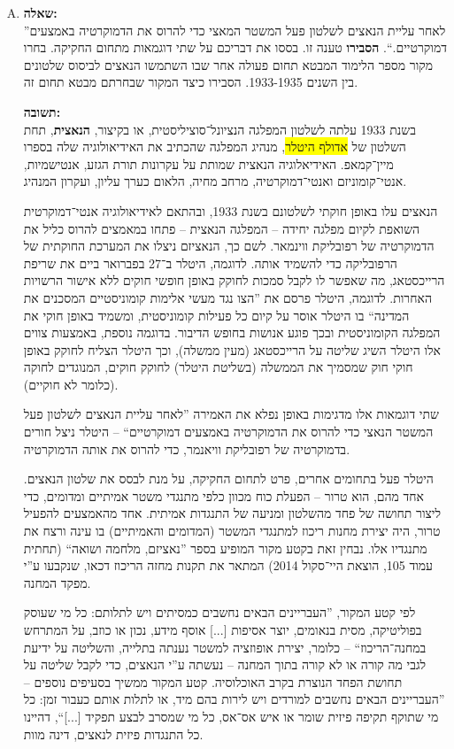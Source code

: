 \documentclass[a4paper]{article}
\newcommand\hl[1]   {\colorbox{yellow}{\!\!#1\!\!}}
\begin{document}
\begin{enumerate}[A.]
			\item \textbf{שאלה: }\\
			''לאחר עליית הנאצים לשלטון פעל המשטר המאצי כדי להרוס את הדמוקרטיה באמצעים דמוקרטיים.``. \textbf{הסבירו} טענה זו. בססו את דבריכם על שתי דוגמאות מתחום החקיקה. בחרו מקור מספר הלימוד המבטא תחום פעולה אחר שבו השתמשו הנאצים לביסוס שלטונים בין השנים 1933-1935. הסבירו כיצד המקור שבחרתם מבטא תחום זה. 
			
			\textbf{תשובה: }\\
			בשנת 1933 עלתה לשלטון המפלגה הנציונל־סוציליסטית, או בקיצור, \textbf{הנאצית}, תחת השלטון של \hl{אדולף היטלר}, מנהיג המפלגה שהכתיב את האידיאולוגיה שלה בספרו מיין־קמאפ. האידיאלוגיה הנאצית שמותת על עקרונות תורת הגזע, אנטישמיות, אנטי־קומוניזם ואנטי־דמוקרטיה, מרחב מחיה, הלאום כערך עליון, ועקרון המנהיג. 
			
			הנאצים עלו באופן חוקתי לשלטונם בשנת 1933, ובהתאם לאידיאולוגיה אנטי־דמוקרטית השואפת לקיום מפלגה יחידה – המפלגה הנאצית – פתחו במאמצים להרוס כליל את הדמוקרטיה של רפובליקת ווינמאר. לשם כך, הנאציזם ניצלו את המערכת החוקתית של הרפובליקה כדי להשמיד אותה. לדוגמה, היטלר ב־27 בפברואר ביים את שריפת הרייכסטאג, מה שאפשר לו לקבל סמכות לחוקק באופן חופשי חוקים ללא אישור הרשויות האחרות. לדוגמה, היטלר פרסם את ''הצו נגד מעשי אלימות קומוניסטיים המסכנים את המדינה`` בו היטלר אוסר על קיום כל פעילות קומוניסטית, ומשמיד באופן חוקי את המפלגה הקומוניסטית ובכך פוגע אנושות בחופש הדיבור. בדוגמה נוספת, באמצעות צווים אלו היטלר השיג שליטה על הרייכסטאג (מעין ממשלה), וכך היטלר הצליח לחוקק באופן חוקי חוק שמסמיך את הממשלה (בשליטת היטלר) לחוקק חוקים, המנוגדים לחוקה (כלומר לא חוקיים). 
			
			שתי דוגמאות אלו מדגימות באופן נפלא את האמירה ''לאחר עליית הנאצים לשלטון פעל המשטר הנאצי כדי להרוס את הדמוקרטיה באמצעים דמוקרטיים`` – היטלר ניצל חורים בדמוקרטיה של רפובליקת וויאנמר, כדי להרוס את אותה הדמוקרטיה. 
			
			היטלר פעל בתחומים אחרים, פרט לתחום החקיקה, על מנת לבסס את שלטון הנאצים. אחד מהם, הוא טרור – הפעלת כוח מכוון כלפי מתנגדי משטר אמיתיים ומדומים, כדי ליצור תחושה של פחד מהשלטון ומניעה של התנגדות אמיתית. אחד מהאמצעים להפעיל טרור, היה יצירת מחנות ריכוז למתנגדי המשטר (המדומים והאמיתיים) בו עינה ורצח את מתנגדיו אלו. נבחין זאת בקטע מקור המופיע בספר ''נאציזם, מלחמה ושואה`` (תחתית עמוד 105, הוצאת היי־סקול 2014) המתאר את תקנות מחזה הריכוז דכאו, שנקבעו ע''י מפקד המחנה.
			
			לפי קטע המקור, ''העבריינים הבאים נחשבים כמסיתים ויש לתלותם: כל מי שעוסק בפוליטיקה, מסית בנאומים, יוצר אסיפות [...] אוסף מידע, נכון או כוזב, על המתרחש במחנה־הריכוז`` – כלומר, יצירת אופוזציה למשטר נענתה בתלייה, והשליטה על ידיעת לגבי מה קורה או לא קורה בתוך המחנה – נעשתה ע''י הנאצים, כדי לקבל שליטה על תחושת הפחד הנוצרת בקרב האוכלוסיה. קטע המקור ממשיך בסעיפים נוספים – ''העבריינים הבאים נחשבים למורדים ויש לירות בהם מיד, או לתלות אותם כעבור זמן: כל מי שתוקף תקיפה פיזית שומר או איש אס־אס, כל מי שמסרב לבצע תפקיד [...]``, דהיינו כל התנגדות פיזית לנאצים, דינה מוות. 
			
		\end{enumerate}
\end{document}
